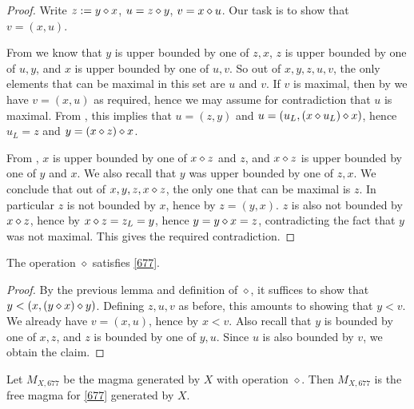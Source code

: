 \begin{proof} Write $z := y \diamond x$, $u = z \diamond y$, $v = x \diamond u$.  Our task is to show that $v = (x,u)$.

From  we know that $y$ is upper bounded by one of $z,x$, $z$ is upper bounded by one of $u,y$, and $x$ is upper bounded by one of $u,v$.  So out of $x,y,z,u,v$, the only elements that can be maximal in this set are $u$ and $v$.  If $v$ is maximal, then by  we have $v = (x,u)$ as required, hence we may assume for contradiction that $u$ is maximal.  From , this implies that $u = (z,y)$ and $u = (u_L, (x \diamond u_L) \diamond x)$, hence $u_L = z$ and $y = (x \diamond z) \diamond x$.

From , $x$ is upper bounded by one of $x \diamond z$ and $z$, and $x \diamond z$ is upper bounded by one of $y$ and $x$.  We also recall that $y$ was upper bounded by one of $z,x$. We conclude that out of $x,y,z,x \diamond z$, the only one that can be maximal is $z$.  In particular $z$ is not bounded by $x$, hence by  $z = (y,x)$.  $z$ is also not bounded by $x \diamond z$, hence by  $x \diamond z = z_L = y$, hence $y = y \diamond x = z$, contradicting the fact that $y$ was not maximal. This gives the required contradiction.
\end{proof}

\begin{corollary}\label{677-satisfy}  The operation $\diamond$ satisfies \eqref{677}.
\end{corollary}

\begin{proof} By the previous lemma and definition of $\diamond$, it suffices to show that $y < (x, (y \diamond x) \diamond y)$.  Defining $z,u,v$ as before, this amounts to showing that $y < v$.  We already have $v = (x,u)$, hence by  $x < v$.  Also recall that $y$ is bounded by one of $x,z$, and $z$ is bounded by one of $y,u$.  Since $u$ is also bounded by $v$, we obtain the claim.
\end{proof}

\begin{corollary} Let $M_{X,677}$ be the magma generated by $X$ with operation $\diamond$.  Then $M_{X,677}$ is the free magma for \eqref{677} generated by $X$.
\end{corollary}

